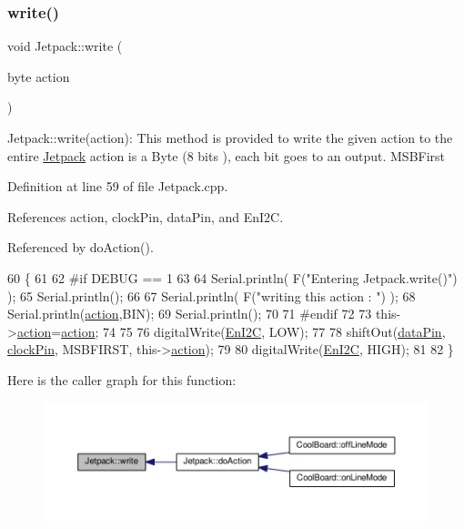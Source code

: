 \subsubsection{\texorpdfstring{write()}{write()}}
{\footnotesize\ttfamily void Jetpack\+::write (\begin{DoxyParamCaption}\item[{byte}]{action }\end{DoxyParamCaption})}

Jetpack\+::write(action)\+: This method is provided to write the given action to the entire \hyperlink{classJetpack}{Jetpack} action is a Byte (8 bits ), each bit goes to an output. M\+S\+B\+First 

Definition at line 59 of file Jetpack.\+cpp.



References action, clock\+Pin, data\+Pin, and En\+I2C.



Referenced by do\+Action().


\begin{DoxyCode}
60 \{
61 
62 \textcolor{preprocessor}{#if DEBUG == 1}
63 
64     Serial.println( F(\textcolor{stringliteral}{"Entering Jetpack.write()"}) );
65     Serial.println();
66 
67     Serial.println( F(\textcolor{stringliteral}{"writing this action : "}) );
68     Serial.println(\hyperlink{classJetpack_aca3142925a7b0834b34ae91d26af7765}{action},BIN);
69     Serial.println();
70 
71 \textcolor{preprocessor}{#endif }
72 
73     this->\hyperlink{classJetpack_aca3142925a7b0834b34ae91d26af7765}{action}=\hyperlink{classJetpack_aca3142925a7b0834b34ae91d26af7765}{action};
74 
75     
76     digitalWrite(\hyperlink{classJetpack_a81df984fb4cea98c71aa1a1cfcdfe814}{EnI2C}, LOW);
77     
78     shiftOut(\hyperlink{classJetpack_a3d669a56e93c71dd25f970d4ed7d0c00}{dataPin}, \hyperlink{classJetpack_a58ebb991f358f3ae94e82148b0221b5a}{clockPin}, MSBFIRST, this->\hyperlink{classJetpack_aca3142925a7b0834b34ae91d26af7765}{action});
79 
80     digitalWrite(\hyperlink{classJetpack_a81df984fb4cea98c71aa1a1cfcdfe814}{EnI2C}, HIGH);
81 
82 \}   
\end{DoxyCode}
Here is the caller graph for this function\+:
\nopagebreak
\begin{figure}[H]
\begin{center}
\leavevmode
\includegraphics[width=350pt]{classJetpack_a338f1af8cbc6504ac69b47c7328569b5_icgraph}
\end{center}
\end{figure}
\mbox{\label{classJetpack_a79ae7bc3c1828a0551a7c005c4f8bd00}} 
